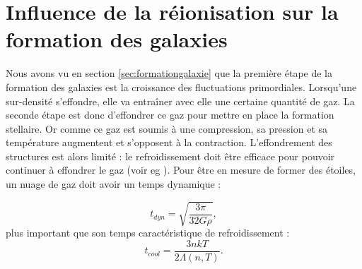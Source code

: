 

\section{Influence de la réionisation sur la formation des galaxies}

Nous avons vu en section \ref{sec:formationgalaxie} que la première étape de la formation des galaxies est la croissance des fluctuations primordiales.
Lorsqu'une sur-densité s’effondre, elle va entraîner avec elle une certaine quantité de gaz.
La seconde étape est donc d’effondrer ce gaz pour mettre en place la formation stellaire.
Or comme ce gaz est soumis à une compression, sa pression et sa température augmentent et s'opposent à la contraction.
L'effondrement des structures est alors limité : le refroidissement doit être efficace pour pouvoir continuer à effondrer le gaz (voir eg \cite{2004ARA&A..42...79B}).
Pour être en mesure de former des étoiles, un nuage de gaz doit avoir un temps dynamique :

\begin{equation}
t_{dyn} =\sqrt{\frac{3 \pi}{32 G \rho}},
\end{equation}
plus important que son temps caractéristique de refroidissement :
\begin{equation}
t_{cool} = \frac{3 nkT}{2 \Lambda(n,T)}.
\end{equation}



